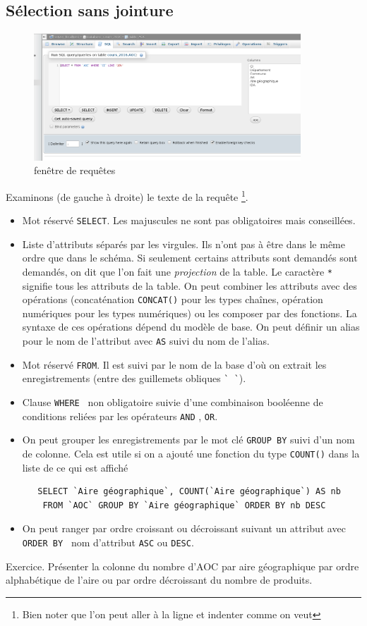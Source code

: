 \subsection{Sélection sans jointure}
\begin{figure}[h]
  \centering
  \includegraphics[width=10cm]{./introbdd_requete.png}
  \caption{fenêtre de requêtes}
  \label{fig:requete}
\end{figure}
Examinons (de gauche à droite) le texte de la requête \footnote{Bien noter que l'on peut aller à la ligne et indenter comme on veut}.
\begin{itemize}
  \item Mot réservé \verb|SELECT|. Les majuscules ne sont pas obligatoires mais conseillées.
  \item Liste d'attributs séparés par les virgules. Ils n'ont pas à être dans le même ordre que dans le schéma. Si seulement certains attributs sont demandés sont demandés, on dit que l'on fait une \emph{projection} de la table. Le caractère \verb|*| signifie tous les attributs de la table. On peut combiner les attributs avec des opérations (concaténation \verb|CONCAT()| pour les types chaînes, opération numériques pour les types numériques) ou les composer par des fonctions. La syntaxe de ces opérations dépend du modèle de base. On peut définir un alias pour le nom de l'attribut avec \verb|AS| suivi du nom de l'alias.
  \item Mot réservé \verb|FROM|. Il est suivi par le nom de la base d'où on extrait les enregistrements (entre des guillemets obliques \verb|` `|).
  \item Clause \verb|WHERE | non obligatoire suivie d'une combinaison booléenne de conditions reliées par les opérateurs \verb|AND| , \verb|OR|.
  \item On peut grouper les enregistrements par le mot clé \verb|GROUP BY| suivi d'un nom de colonne. Cela est utile si on a ajouté une fonction du type \verb|COUNT()| dans la liste de ce qui est affiché
  \begin{verbatim}
   SELECT `Aire géographique`, COUNT(`Aire géographique`) AS nb 
    FROM `AOC` GROUP BY `Aire géographique` ORDER BY nb DESC
  \end{verbatim}
  \item On peut ranger par ordre croissant ou décroissant suivant un attribut avec \verb|ORDER BY | nom d'attribut \verb|ASC| ou \verb|DESC|.
\end{itemize}
Exercice. Présenter la colonne du nombre d'AOC par aire géographique par ordre alphabétique de l'aire ou par ordre décroissant du nombre de produits.


